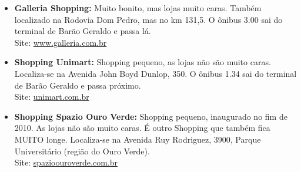 \begin{itemize}
\item   \textbf{Galleria Shopping:} Muito bonito, mas lojas muito caras. Também
        localizado na Rodovia Dom Pedro, mas no km 131,5. O ônibus 3.00 sai do
        terminal de Barão Geraldo e passa lá.
        \\Site: \url{www.galleria.com.br}

\item   \textbf{Shopping Unimart:} Shopping pequeno, as lojas não são muito
        caras. Localiza-se na Avenida John Boyd Dunlop, 350. O ônibus 1.34 sai
        do terminal de Barão Geraldo e passa próximo.
        \\Site: \url{unimart.com.br}

\item   \textbf{Shopping Spazio Ouro Verde:} Shopping pequeno, inaugurado 
        no fim de 2010. As lojas não são muito caras. É outro Shopping que 
        também fica MUITO longe. Localiza-se na Avenida Ruy Rodriguez, 3900, 
        Parque Universitário (região do Ouro Verde).
        \\Site: \url{spazioouroverde.com.br}

\end{itemize}

